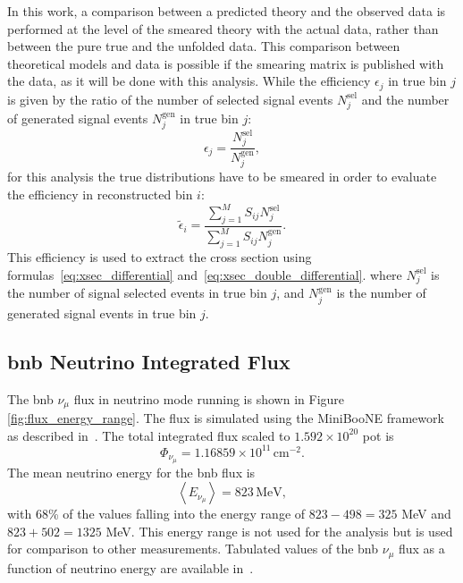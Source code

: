 In this work, a comparison between a predicted theory and the observed data is performed at the level of the smeared theory with the actual data, rather than between the pure true and the unfolded data. This comparison between theoretical models and data is possible if the smearing matrix is published with the data, as it will be done with this analysis.
While the efficiency $\epsilon_j$ in true bin $j$ is given by the ratio of the number of selected signal  events $N^\text{sel}_j$ and the number of generated signal events $N^\text{gen}_j$ in true bin $j$:
\begin{equation}
\label{eq:eff_true}
{\epsilon}_j = \frac{ N^\text{sel}_j}{ N^\text{gen}_j},
\end{equation}
for this analysis the true distributions have to be smeared in order to evaluate the efficiency in reconstructed bin $i$:
\begin{equation}
\label{eq:eff_smear}
\tilde{\epsilon}_i = \frac{ \sum_{j=1}^{M} S_{ij}N^\text{sel}_j}{ \sum_{j=1}^{M} S_{ij}N^\text{gen}_j}.
\end{equation}
This efficiency is used to extract the cross section using formulas~\eqref{eq:xsec_differential} and~\eqref{eq:xsec_double_differential}.
where $N^\text{sel}_j$ is the number of signal selected events in true bin $j$, and $N^\text{gen}_j$ is the number of generated signal events in true bin $j$. 






\subsection{\acrshort{bnb} Neutrino Integrated Flux}
\label{sec:flux}

The \acrshort{bnb} $\nu_\mu$ flux in neutrino mode running is shown in Figure \ref{fig:flux_energy_range}. The flux is simulated using the MiniBooNE framework as described in~\cite{miniboone_flux}. The total integrated flux scaled to $1.592 \times 10^{20}$ \acrshort{pot} is
\begin{equation}
\Phi_{\nu_\mu} = 1.16859 \times 10^{11} \, \text{cm}^{-2}.
\end{equation}
The mean neutrino energy for the \acrshort{bnb} flux is 
\begin{equation}
\label{eq:nu_energy_range}
\left < E_{\nu_{\mu}} \right > = 823 \, \text{MeV},
\end{equation}
with 68\% of the values falling into the energy range of $823 - 498 = 325$ MeV and $823 + 502 = 1325$ MeV.
This energy range is not used for the analysis but is used for comparison to other measurements. Tabulated values of the \acrshort{bnb} $\nu_\mu$ flux as a function of neutrino energy are available in~\cite{flux_note}.

